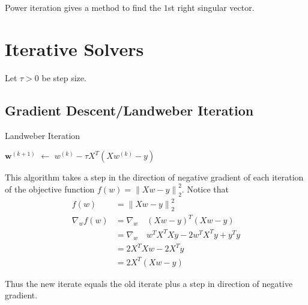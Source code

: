 \documentclass[12pt]{article}
\theoremstyle{definition}
\newcommand*\Let[2]{\State #1 $\gets$ #2}
\newcommand{\norm}[1]{\left\lVert#1\right\rVert}
\begin{document}
Power iteration gives a method to find the $1$st right singular vector. 



\section{Iterative Solvers}
Let $\tau > 0$ be step size.
\subsection{Gradient Descent/Landweber Iteration}
\begin{algorithm}
  \caption{Landweber Iteration}
  \begin{algorithmic}[ht]
    	\Let{$\bm w^{(k+1)}$}{$w^{(k)} - \tau X^T(Xw^{(k)} - y)$}
    \EndFor
  \end{algorithmic}
\end{algorithm}

This algorithm takes a step in the direction of negative gradient of each iteration of the objective function $f(w) = \norm{Xw - y}^2_2$. Notice that
\begin{align*}
	f(w)  &= \norm{Xw -y}^2_2 \\
	\nabla_w f(w) &= \nabla_w \quad (Xw -y)^T (Xw -y) \\
	&= \nabla_w \quad w^T X^T X y - 2w^T X^T y + y^T y \\
	&= 2X^T X w - 2X^T y \\
	&= 2X^T(Xw -y)
\end{align*}

Thus the new iterate equals the old iterate plus a step in direction of negative gradient.
\end{document}
